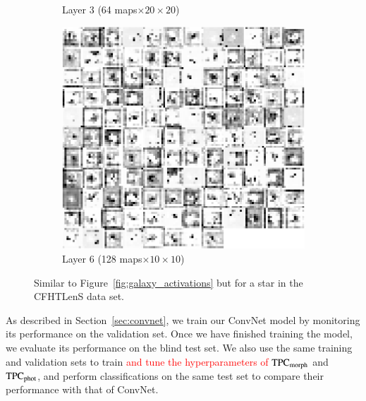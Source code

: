 \documentclass[fleqn,usenatbib]{mnras}
\newcommand{\changed}[1]{\textcolor{red}{#1}}
\begin{document}
\begin{figure}
\begin{subfigure}[c]{0.24\linewidth}
    \caption{Layer 3 (64 maps$\times20\times20$)}
  \end{subfigure}
  \hfill
  \begin{subfigure}[c]{0.24\linewidth}
  \centering
    \includegraphics[width=\textwidth]{figures/star_conv31.pdf}
    \caption{Layer 6 (128 maps$\times10\times10$)}
  \end{subfigure}
  \caption{
    Similar to Figure~\ref{fig:galaxy_activations} but for a star in the
    CFHTLenS data set.
    }
  \label{fig:star_activations}
\end{figure}

As described in Section~\ref{sec:convnet},
we train our ConvNet model by monitoring its performance on the validation set.
Once we have finished training the model,
we evaluate its performance on the blind test set.
We also use the same training and validation sets to train
\changed{
and tune the hyperparameters of 
}
${\mathrm{TPC}}_{{\mathrm{morph}}}$ and ${\mathrm{TPC}}_{{\mathrm{phot}}}$, and
perform classifications on the same test set to compare their performance
with that of ConvNet.
\end{document}
